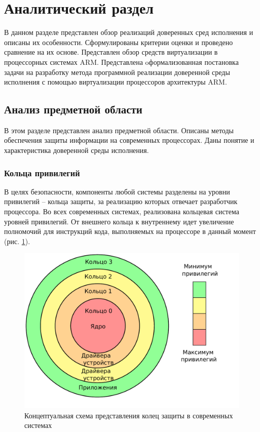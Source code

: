 \section{Аналитический раздел}

В данном разделе представлен обзор реализаций доверенных сред исполнения и описаны их особенности. Сформулированы критерии оценки и проведено сравнение на их основе. Представлен обзор средств виртуализации в процессорных системах ARM. Представлена oформализованная постановка задачи на разработку метода программной реализации доверенной среды исполнения с помощью виртуализации процессоров архитектуры ARM.

\subsection{Анализ предметной области}

В этом разделе представлен анализ предметной области. Описаны методы обеспечения защиты информации на современных процессорах. Даны понятие и характеристика доверенной среды исполнения.

\subsubsection{Кольца привилегий}

В целях безопасности, компоненты любой системы разделены на уровни привилегий -- кольца защиты, за реализацию которых отвечает разработчик процессора. Во всех современных системах, реализована кольцевая система уровней привилегий. От внешнего кольца к внутреннему идет увеличение полномочий для инструкций кода, выполняемых на процессоре в данный момент (рис. \ref{fig:rings}).

\begin{figure}[h]
	\centering
	\includegraphics[width=\textwidth]{img/rings.pdf}
	\caption{Концептуальная схема представления колец защиты в современных системах}
	\label{fig:rings}
\end{figure}

